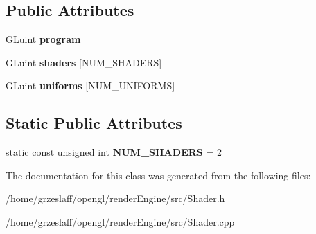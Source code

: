 \subsection*{Public Attributes}
\begin{DoxyCompactItemize}
\item 
\hypertarget{classShader_af036f983d35fe0f8f31dedc009b3645e}{G\-Luint {\bfseries program}}\label{classShader_af036f983d35fe0f8f31dedc009b3645e}

\item 
\hypertarget{classShader_a02c2fb780a0a83966868b2afd5e93495}{G\-Luint {\bfseries shaders} \mbox{[}N\-U\-M\-\_\-\-S\-H\-A\-D\-E\-R\-S\mbox{]}}\label{classShader_a02c2fb780a0a83966868b2afd5e93495}

\item 
\hypertarget{classShader_a6ee5d92f27a839c020e86d86e967bd34}{G\-Luint {\bfseries uniforms} \mbox{[}N\-U\-M\-\_\-\-U\-N\-I\-F\-O\-R\-M\-S\mbox{]}}\label{classShader_a6ee5d92f27a839c020e86d86e967bd34}

\end{DoxyCompactItemize}
\subsection*{Static Public Attributes}
\begin{DoxyCompactItemize}
\item 
\hypertarget{classShader_aba8af13b366d00161411e07f7042d021}{static const unsigned int {\bfseries N\-U\-M\-\_\-\-S\-H\-A\-D\-E\-R\-S} = 2}\label{classShader_aba8af13b366d00161411e07f7042d021}

\end{DoxyCompactItemize}


The documentation for this class was generated from the following files\-:\begin{DoxyCompactItemize}
\item 
/home/grzeslaff/opengl/render\-Engine/src/Shader.\-h\item 
/home/grzeslaff/opengl/render\-Engine/src/Shader.\-cpp\end{DoxyCompactItemize}
